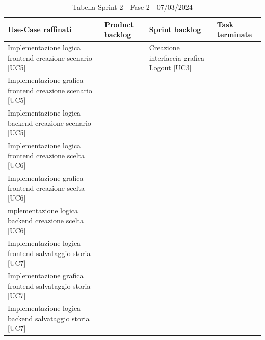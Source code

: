 \documentclass{article}
\begin{document}
\begin{table}[h]
    \centering
    \begin{tabularx}{\textwidth}{|X|X|X|X|}
        \hline
        \bf Use-Case raffinati & \bf Product backlog & \bf Sprint backlog & \bf Task terminate \\
        \hline
        Implementazione logica frontend creazione scenario [UC5] & & Creazione interfaccia grafica Logout [UC3] & \\
        \hline
        Implementazione grafica frontend creazione scenario [UC5] & & & \\
        \hline
        Implementazione logica backend creazione scenario [UC5] & & & \\
        \hline
        Implementazione logica frontend creazione scelta [UC6] & & & \\
        \hline
        Implementazione grafica frontend creazione scelta [UC6] & & & \\
        \hline
        mplementazione logica backend creazione scelta [UC6] & & & \\
        \hline
        Implementazione logica frontend salvataggio storia [UC7] & & & \\
        \hline
        Implementazione grafica frontend salvataggio storia [UC7] & & & \\
        \hline
        Implementazione logica backend salvataggio storia [UC7] & & & \\
        \hline
    \end{tabularx}
    \caption*{Tabella Sprint 2 - Fase 2 - 07/03/2024}
\end{table}
\end{document}

